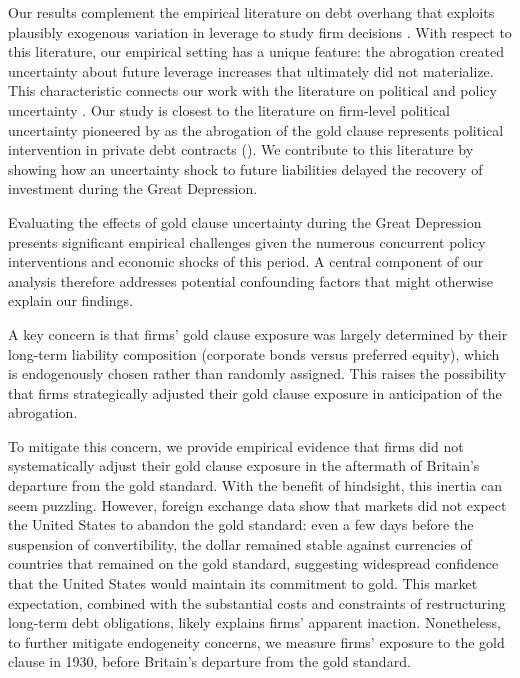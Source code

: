 Our results complement the empirical literature on debt overhang that exploits plausibly exogenous variation in leverage to study firm decisions \citep[e.g.,][]{Giroud2012, Wittry2018, Bennett2025}. With respect to this literature, our empirical setting has a unique feature: the abrogation created uncertainty about future leverage increases that ultimately did not materialize. This characteristic connects our work with the literature on political and policy uncertainty \citep{Bloom2009, Baker2016, Hassan2019}. Our study is closest to the literature on firm-level political uncertainty pioneered by \cite{Hassan2019} as the abrogation of the gold clause represents political intervention in private debt contracts (\cite{Bolton2002}). We contribute to this literature by showing how an uncertainty shock to future liabilities delayed the recovery of investment during the Great Depression.

Evaluating the effects of gold clause uncertainty during the Great Depression presents significant empirical challenges given the numerous concurrent policy interventions and economic shocks of this period. A central component of our analysis therefore addresses potential confounding factors that might otherwise explain our findings.

A key concern is that firms' gold clause exposure was largely determined by their long-term liability composition (corporate bonds versus preferred equity), which is endogenously chosen rather than randomly assigned. This raises the possibility that firms strategically adjusted their gold clause exposure in anticipation of the abrogation. 

To mitigate this concern, we provide empirical evidence that firms did not systematically adjust their gold clause exposure in the aftermath of Britain's departure from the gold standard. With the benefit of hindsight, this inertia can seem puzzling. However, foreign exchange data show that markets did not expect the United States to abandon the gold standard: even a few days before the suspension of convertibility, the dollar remained stable against currencies of countries that remained on the gold standard, suggesting widespread confidence that the United States would maintain its commitment to gold. This market expectation, combined with the substantial costs and constraints of restructuring long-term debt obligations, likely explains firms' apparent inaction. Nonetheless, to further mitigate endogeneity concerns, we measure firms' exposure to the gold clause in 1930, before Britain's departure from the gold standard.

